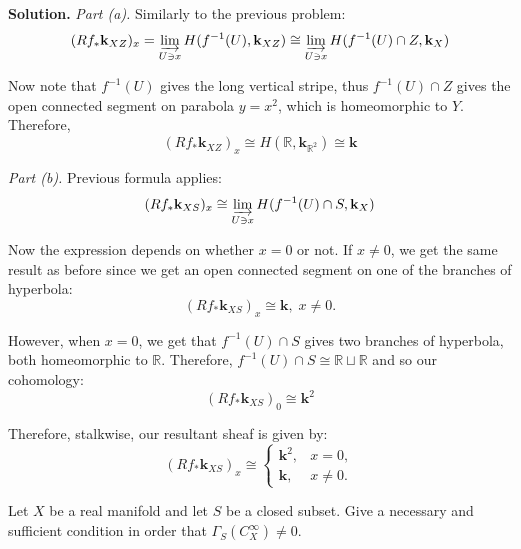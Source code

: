 \documentclass{category-template}
\begin{document}
\textbf{Solution.} \textit{Part (a).} Similarly to the previous problem:
\begin{equation*}
    (Rf_*\mathbf{k}_{XZ})_x = \varinjlim_{U \ni x} H(f^{-1}(U), \mathbf{k}_{XZ}) \cong \varinjlim_{U \ni x} H(f^{-1}(U) \cap Z, \mathbf{k}_{X})
\end{equation*}

Now note that $f^{-1}(U)$ gives the long vertical stripe, thus $f^{-1}(U) \cap
Z$ gives the open connected segment on parabola $y=x^2$, which is homeomorphic
to $Y$. Therefore,
\begin{equation*}
    (Rf_*\mathbf{k}_{XZ})_x \cong H(\mathbb{R}, \mathbf{k}_{\mathbb{R}^2}) \cong \mathbf{k}
\end{equation*}

\textit{Part (b).} Previous formula applies:
\begin{equation*}
    (Rf_*\mathbf{k}_{XS})_x \cong \varinjlim_{U \ni x} H(f^{-1}(U) \cap S, \mathbf{k}_{X})
\end{equation*}

Now the expression depends on whether $x=0$ or not. If $x \neq 0$, we get 
the same result as before since we get an open connected segment on one of the 
branches of hyperbola:
\begin{equation*}
    (Rf_*\mathbf{k}_{XS})_x \cong \mathbf{k}, \; x \neq 0.
\end{equation*}

However, when $x=0$, we get that $f^{-1}(U) \cap S$ gives two branches of
hyperbola, both homeomorphic to $\mathbb{R}$. Therefore, $f^{-1}(U) \cap S \cong
\mathbb{R} \sqcup \mathbb{R}$ and so our cohomology:
\begin{equation*}
    (Rf_*\mathbf{k}_{XS})_0 \cong \mathbf{k}^2
\end{equation*}

Therefore, stalkwise, our resultant sheaf is given by:
\begin{equation*}
    (Rf_*\mathbf{k}_{XS})_x \cong \begin{cases}
        \mathbf{k}^2, & x = 0, \\
        \mathbf{k}, & x \neq 0.
    \end{cases}
\end{equation*}

\begin{problem}
    Let $X$ be a real manifold and let $S$ be a closed subset. Give a necessary 
    and sufficient condition in order that $\Gamma_S(C_X^{\infty}) \neq 0$.
\end{problem}
\end{document}
